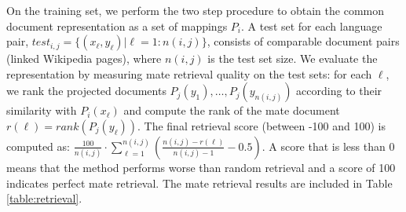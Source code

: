 \documentclass[twoside,11pt]{article}
\begin{document}
On the training set, we perform the two step procedure to obtain the common document representation as a set of mappings $P_i$. A test set for each language pair, $test_{i,j} = \{(x_\ell,y_\ell) | \ell = 1:n(i,j)\} $, consists of comparable document pairs (linked Wikipedia pages), where $n(i,j)$ is the test set size. We evaluate the representation by measuring mate retrieval quality on the test sets: for each $\ell$, we rank the projected documents $P_j(y_1),\ldots, P_j(y_{n(i,j)})$ according to their similarity with $P_i(x_\ell)$ and compute the rank of the mate document $r(\ell) = rank(P_j(y_\ell))$. The final retrieval score (between -100 and 100) is computed as: $\frac{100}{n(i,j)} \cdot \sum_{\ell = 1}^{n(i,j)} \left( \frac{n(i,j) - r(\ell)}{n(i,j) -1} -0.5\right)$. A score that is less than 0 means that the method performs worse than random retrieval and a score of 100 indicates perfect mate retrieval. The mate retrieval results are included in Table \ref{table:retrieval}.
\end{document}
